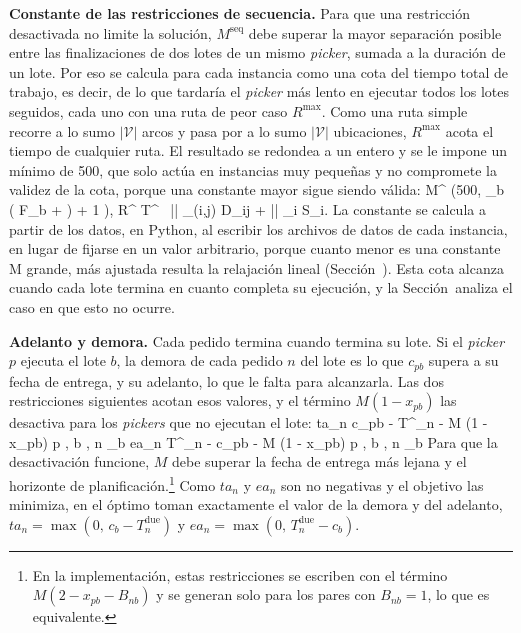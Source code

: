{\bf Constante de las restricciones de secuencia.} Para que una restricción
desactivada no limite la solución, $M^{\text{seq}}$ debe superar la mayor
separación posible entre las finalizaciones de dos lotes de un mismo
{\em picker}, sumada a la duración de un lote. Por eso se calcula para cada
instancia como una cota del tiempo total de trabajo, es decir, de lo que
tardaría el {\em picker} más lento en ejecutar todos los lotes seguidos, cada
uno con una ruta de peor caso $R^{\max}$. Como una ruta simple recorre a lo
sumo $|\mathcal{V}|$ arcos y pasa por a lo sumo $|\mathcal{V}|$ ubicaciones,
$R^{\max}$ acota el tiempo de cualquier ruta. El resultado se redondea a un
entero y se le impone un mínimo de 500, que solo actúa en instancias muy
pequeñas y no compromete la validez de la cota, porque una constante mayor
sigue siendo válida:
\startformula
	\startalign[n=2, align={right,left}]
		\NC M^{} \EQ \max\left(500,\; \sum_{b \in {}} \left( F_b +  \right) + 1 \right), \NR
		\NC R^{\max} \EQ T^{} \, || \max_{(i,j) \in {}} D_{ij} \;+\; || \max_{i \in {}} S_i. \NR
	\stopalign
\stopformula
La constante se calcula a partir de los datos, en Python, al escribir los
archivos de datos de cada instancia, en lugar de fijarse en un
valor arbitrario, porque cuanto menor es una constante M grande, más ajustada
resulta la relajación lineal (Sección~). Esta cota alcanza
cuando cada lote termina en cuanto completa su ejecución, y la
Sección~ analiza el caso en que esto no
ocurre.

{\bf Adelanto y demora.} Cada pedido termina cuando termina su lote. Si el
{\em picker} $p$ ejecuta el lote $b$, la demora de cada pedido $n$ del lote es
lo que $c_{pb}$ supera a su fecha de entrega, y su adelanto, lo que le falta
para alcanzarla. Las dos restricciones siguientes acotan esos valores, y el
término $M (1 - x_{pb})$ las desactiva para los {\em pickers} que no ejecutan
el lote:
\startplaceformula
\startformula
	\startalign[n=3, align={right,left,left}]
		\NC \NC ta_n \geq c_{pb} - T^{}_n - M (1 - x_{pb}) \NC \qquad \forall p \in {},\; b \in {},\; n \in {}_b 
		\NC \NC ea_n \geq T^{}_n - c_{pb} - M (1 - x_{pb}) \NC \qquad \forall p \in {},\; b \in {},\; n \in {}_b 
	\stopalign
\stopformula
\stopplaceformula
Para que la desactivación funcione, $M$ debe superar la fecha de entrega más
lejana y el horizonte de planificación.\footnote{En la implementación, estas restricciones se escriben
con el término $M (2 - x_{pb} - B_{nb})$ y se generan solo para los pares con
$B_{nb} = 1$, lo que es equivalente.} Como $ta_n$ y $ea_n$ son no negativas y el
objetivo las minimiza, en el óptimo toman exactamente el valor de la demora y
del adelanto, $ta_n = \max(0,\, c_b - T^{\text{due}}_n)$ y
$ea_n = \max(0,\, T^{\text{due}}_n - c_b)$.


